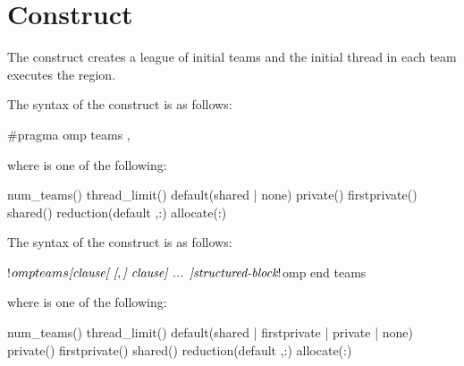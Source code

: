 \section{ Construct}
\label{sec:teams Construct}
\summary
The  construct creates a league of initial teams and the initial thread in each
team executes the region.

\syntax
\begin{ccppspecific}
The syntax of the  construct is as follows:

\begin{ompcPragma}
#pragma omp teams \plc{[clause[ [},\plc{] clause] ... ] new-line}
\end{ompcPragma}

where  is one of the following:

\begin{indentedcodelist}
num_teams()
thread_limit()
default(shared \textnormal{|} none)
private()
firstprivate()
shared()
reduction(\plc{[}default ,\plc{] reduction-identifier }:)
allocate(\plc{[allocator }:\plc{] list})
\end{indentedcodelist}
\end{ccppspecific}

\begin{fortranspecific}
The syntax of the  construct is as follows:

\begin{ompfPragma}
!$omp teams \plc{[clause[ [},\plc{] clause] ... ]}
    \plc{structured-block}
!$omp end teams
\end{ompfPragma}


where  is one of the following:

\begin{indentedcodelist}
num_teams()
thread_limit()
default(shared \textnormal{|} firstprivate \textnormal{|} private \textnormal{|} none)
private()
firstprivate()
shared()
reduction(\plc{[}default ,\plc{] reduction-identifier }:)
allocate(\plc{[allocator }:\plc{] list})
\end{indentedcodelist}

\end{fortranspecific}

